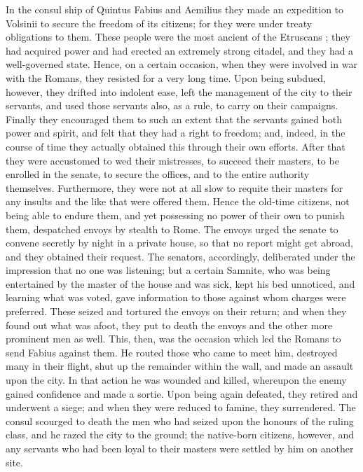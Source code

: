 In the consul ­ship of Quintus Fabius and Aemilius they made an expedition to Volsinii to secure the freedom of its citizens; for they were under treaty obligations to them. These people were the most ancient of the Etruscans ; they had acquired power and had erected an extremely strong citadel, and they had a well-governed state. Hence, on a certain occasion, when they were involved in war with the Romans, they resisted for a very long time. Upon being subdued, however, they drifted into indolent ease, left the management of the city to their servants, and used those servants also, as a rule, to carry on their campaigns. Finally they encouraged them to such an extent that the servants gained both power and spirit, and felt that they had a right to freedom; and, indeed, in the course of time they actually obtained this through their own efforts. After that they were accustomed to wed their mistresses, to succeed their masters, to be enrolled in the senate, to secure the offices, and to the entire authority themselves. Furthermore, they were not at all slow to requite their masters for any insults and the like that were offered them. Hence the old-time citizens, not being able to endure them, and yet possessing no power of their own to punish them, despatched envoys by stealth to Rome. The envoys urged the senate to convene secretly by night in a private house, so that no report might get abroad, and they obtained their request. The senators, accordingly, deliberated under the impression that no one was listening; but a certain Samnite, who was being entertained by the master of the house and was sick, kept his bed unnoticed, and learning what was voted, gave information to those against whom charges were preferred. These seized and tortured the envoys on their return; and when they found out what was afoot, they put to death the envoys and the other more prominent men as well. This, then, was the occasion which led the Romans to send Fabius against them. He routed those who came to meet him, destroyed many in their flight, shut up the remainder within the wall, and made an assault upon the city. In that action he was wounded and killed, whereupon the enemy gained confidence and made a sortie. Upon being again defeated, they retired and underwent a siege; and when they were reduced to famine, they surrendered. The consul scourged to death the men who had seized upon the honours of the ruling class, and he razed the city to the ground; the native-born citizens, however, and any servants who had been loyal to their masters were settled by him on another site.

